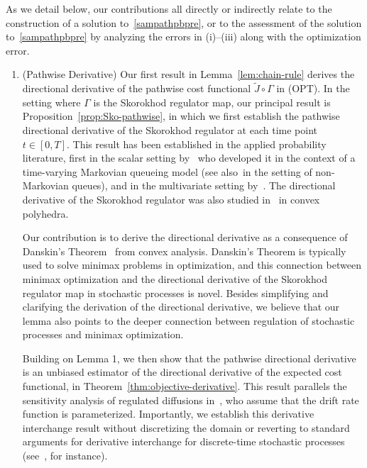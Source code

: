 \documentclass[11pt,leqno]{amsart}
\begin{document}
As we detail below, our contributions all directly or indirectly relate to the construction of a solution to~\eqref{sampathpbpre}, or to the assessment of the solution to~\eqref{sampathpbpre} by analyzing the errors in (i)--(iii) along with the optimization error. 

\begin{enumerate}[leftmargin=*]
	\item (Pathwise Derivative) Our first result in Lemma~\ref{lem:chain-rule} derives the directional derivative of the pathwise cost functional $\tilde J \circ \Gamma$ in (OPT). In the setting where $\Gamma$ is the Skorokhod regulator map, our principal result is Proposition~\ref{prop:Sko-pathwise}, in which we first establish the pathwise directional derivative of the Skorokhod regulator at each time point $t \in [0,T]$. This result has been established in the applied probability literature, first in the scalar setting by~\cite{MM} who developed it in the context of a time-varying Markovian queueing model (see also~\cite{Whitt_2002,Honnappa2015}in the setting of non-Markovian queues), and in the multivariate setting by~\cite{MR}. The directional derivative of the Skorokhod regulator was also studied in~\cite{Lipshutz_2018,Lipshutz_2019} in convex polyhedra. 
    
    Our contribution is to derive the directional derivative as a consequence of Danskin's Theorem~\cite[Theorem 7.21]{sha04} from convex analysis. Danskin's Theorem is typically used to solve minimax problems in optimization, and this connection between minimax optimization and the directional derivative of the Skorokhod regulator map in stochastic processes is novel. Besides simplifying and clarifying the derivation of the directional derivative, we believe that our lemma also points to the deeper connection between regulation of stochastic processes and minimax optimization. 

    Building on Lemma 1, we then show that the pathwise directional derivative is an unbiased estimator of the directional derivative of the expected cost functional, in Theorem~\ref{thm:objective-derivative}. This result parallels the sensitivity analysis of regulated diffusions in~\cite{Lipshutz1}, who assume that the drift rate function is parameterized. Importantly, we establish this derivative interchange result without discretizing the domain or reverting to standard arguments for derivative interchange for discrete-time stochastic processes (see~\cite{glasserman1990gradient}, for instance). 


\end{enumerate}
\end{document}
